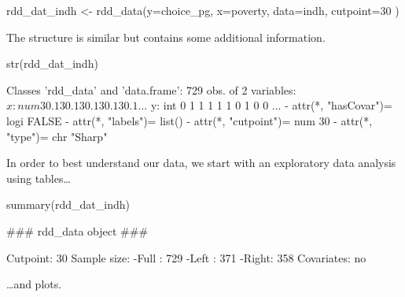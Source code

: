 \documentclass[article]{jss}
\begin{document}
\begin{CodeChunk}
\begin{CodeInput}
rdd_dat_indh <- rdd_data(y=choice_pg,
                         x=poverty,
                         data=indh,
                         cutpoint=30 )
\end{CodeInput}
\end{CodeChunk}

The structure is similar but contains some additional information.

\begin{CodeChunk}
\begin{CodeInput}
str(rdd_dat_indh)
\end{CodeInput}
\begin{CodeOutput}
Classes 'rdd_data' and 'data.frame':    729 obs. of  2 variables:
 $ x: num  30.1 30.1 30.1 30.1 30.1 ...
 $ y: int  0 1 1 1 1 1 0 1 0 0 ...
 - attr(*, "hasCovar")= logi FALSE
 - attr(*, "labels")= list()
 - attr(*, "cutpoint")= num 30
 - attr(*, "type")= chr "Sharp"
\end{CodeOutput}
\end{CodeChunk}

In order to best understand our data, we start with an exploratory data
analysis using tables\ldots{}

\begin{CodeChunk}
\begin{CodeInput}
summary(rdd_dat_indh)
\end{CodeInput}
\begin{CodeOutput}
### rdd_data object ###

Cutpoint: 30 
Sample size: 
    -Full : 729 
    -Left : 371 
    -Right: 358
Covariates: no 
\end{CodeOutput}
\end{CodeChunk}

\ldots{}and plots.
\end{document}
